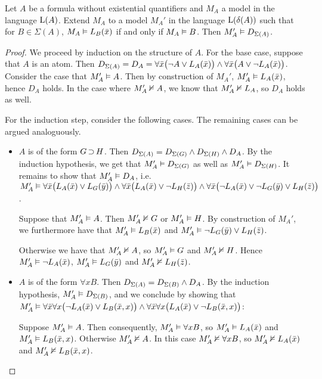 \begin{lemma}
	\label{lemma:m_prime}
	Let $A$ be a formula without existential quantifiers and $M_A$ a model in the language $\operatorname{L}(A)$.
	Extend $M_A$ to a model $M_A'$ in the language $\operatorname{L}(\delta(A))$ such that for $B\in\Sigma(A)$, $M_A\vDash L_B(\bar x)$ if and only if $M_A \vDash B$.
	Then $M_A' \vDash D_{\Sigma(A)}$.
\end{lemma}
\begin{proof}
	We proceed by induction on the structure of $A$.
	For the base case, suppose that $A$ is an atom. 
	Then $D_{\Sigma(A)} = D_A  =\allowbreak \forall \bar x \big(\lnot A \lor L_A(\bar x)\big) \land\allowbreak \forall \bar x \big(A \lor \lnot L_A(\bar x)\big)$. 
	Consider the case that $M_A' \vDash A$. Then by construction of $M_A'$, $M_A'\vDash L_A(\bar x)$, hence $D_A$ holds.
	In the case where $M_A' \nvDash A$, we know that $M_A' \nvDash L_A$, so $D_A$ holds as well.

	For the induction step, consider the following cases. The remaining cases can be argued analoguously.
	\begin{itemize}
		\item $A$ is of the form $G \operatorname{\supset} H$. 
			Then $D_{\Sigma(A)} =
			D_{\Sigma(G)} \land
			D_{\Sigma(H)} \land D_A$.
			By the induction hypothesis, we get that $M_A' \vDash D_{\Sigma(G)}$ as well as $M_A' \vDash D_{\Sigma(H)}$.
			It remains to show that $M_A' \vDash D_A$, i.e.~
			$M_A' \vDash \forall \bar x \big(L_A(\bar x) \lor L_G(\bar y)\big) \land
			\forall \bar x \big(L_A(\bar x) \lor \lnot L_H(\bar z)\big) \land \forall \bar x \big(\lnot L_A(\bar x) \lor \lnot L_G(\bar y) \lor L_H(\bar z)\big)  $.

			Suppose that $M_A' \vDash A$.
			Then $M_A' \nvDash G$ or $M_A' \vDash H$. By construction of $M_A'$, we furthermore have that $M_A' \vDash L_B(\bar x)$ and $M_A' \vDash \lnot L_G(\bar y) \lor L_H(\bar z)$.

			Otherwise we have that $M_A' \nvDash A$, so $M_A' \vDash G$ and $M_A' \nvDash H$.
			Hence $M_A' \vDash \lnot  L_A(\bar x)$, $M_A' \vDash L_G(\bar y)$ and $M_A' \nvDash L_H(\bar z)$.

		\item $A$ is of the form $\forall x B$.
			Then $D_{\Sigma(A)} =
			D_{\Sigma(B)} \land D_A$.
			By the induction hypothesis,  $M_A' \vDash D_{\Sigma(B)}$, and we conclude by showing that $M_A' \vDash \forall \bar x \forall x \big(\lnot L_A(\bar x) \lor L_B(\bar x, x)\big) \land \forall \bar x \forall x \big(L_A(\bar x) \lor \lnot L_B(\bar x, x)\big)$:


			Suppose $M_A' \vDash A$. Then consequently, $M_A' \vDash \forall x B$, so $M_A' \vDash L_A(\bar x)$ and $M_A' \vDash L_B(\bar x, x)$.
			Otherwise $M_A' \nvDash A$. In this case $M_A' \nvDash \forall x B$, so $M_A' \nvDash L_A(\bar x)$ and $M_A' \nvDash L_B(\bar x, x)$.
			\qedhere
	\end{itemize}

\end{proof}




